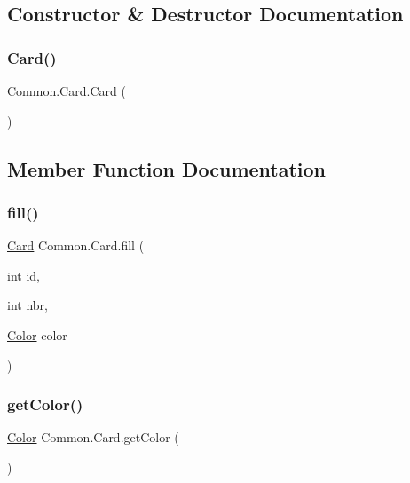 \subsection{Constructor \& Destructor Documentation}
\mbox{\label{classCommon_1_1Card_aa34725a77b9b1303b5c67b9c2a9cf957}} 
\subsubsection{\texorpdfstring{Card()}{Card()}}
{\footnotesize\ttfamily Common.\+Card.\+Card (\begin{DoxyParamCaption}{ }\end{DoxyParamCaption})\hspace{0.3cm}{\ttfamily [inline]}}



\subsection{Member Function Documentation}
\mbox{\label{classCommon_1_1Card_a98fe165a8fb52b177efb8cf58961d876}} 
\subsubsection{\texorpdfstring{fill()}{fill()}}
{\footnotesize\ttfamily \mbox{\hyperlink{classCommon_1_1Card}{Card}} Common.\+Card.\+fill (\begin{DoxyParamCaption}\item[{int}]{id,  }\item[{int}]{nbr,  }\item[{\mbox{\hyperlink{enumCommon_1_1Color}{Color}}}]{color }\end{DoxyParamCaption})\hspace{0.3cm}{\ttfamily [inline]}}

\mbox{\label{classCommon_1_1Card_a7527a91352a5c110c79a175f719b3abc}} 
\subsubsection{\texorpdfstring{get\+Color()}{getColor()}}
{\footnotesize\ttfamily \mbox{\hyperlink{enumCommon_1_1Color}{Color}} Common.\+Card.\+get\+Color (\begin{DoxyParamCaption}{ }\end{DoxyParamCaption})\hspace{0.3cm}{\ttfamily [inline]}}

